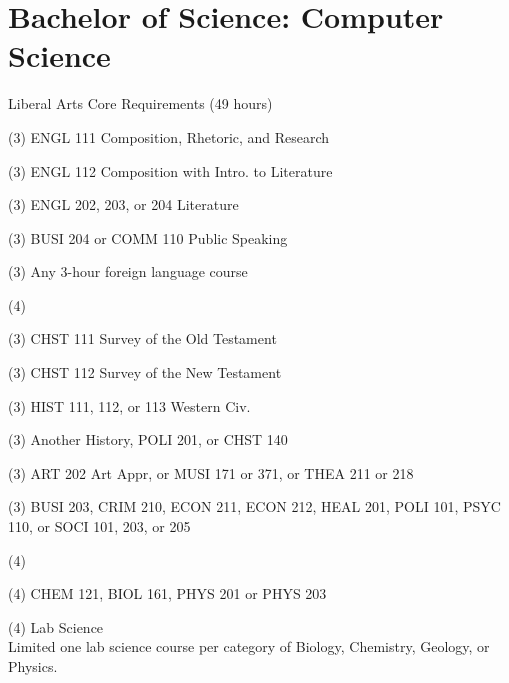 \label{program:bs-cs}%
\section*{Bachelor of Science: Computer Science}

\begin{reqgroup}{Liberal Arts Core Requirements (49 hours)}
\begin{checklist}
\begin{minipage}[t]{0.5\linewidth}
	\item (3) ENGL 111 Composition, Rhetoric, and Research
	\item (3) ENGL 112 Composition with Intro\@. to Literature
	\item (3) ENGL 202, 203, or 204 Literature
	\item (3) BUSI 204 or COMM 110 Public Speaking
	\item (3) Any 3-hour foreign language course
	\item (4)  
	\item (3) CHST 111  Survey of the Old Testament
	\item (3) CHST 112  Survey of the New Testament
	\item (3) HIST 111, 112, or 113 Western Civ.
\end{minipage}
\begin{minipage}[t]{0.5\linewidth}
	\item (3)	Another History, POLI 201, or CHST 140
	\item (3)	ART 202 Art Appr, or MUSI 171 or 371, or THEA 211 or 218
	\item (3)	BUSI 203, CRIM 210, ECON 211, ECON 212, HEAL 201, POLI 101, PSYC 110, or SOCI 101, 203, or 205
	\item (4)	 
	\item (4)	CHEM 121, BIOL 161, PHYS 201 or PHYS 203
	\item (4)	Lab Science\\Limited one lab science course per category of Biology, Chemistry,
Geology, or Physics.
\end{minipage}
\end{checklist}
\end{reqgroup}

